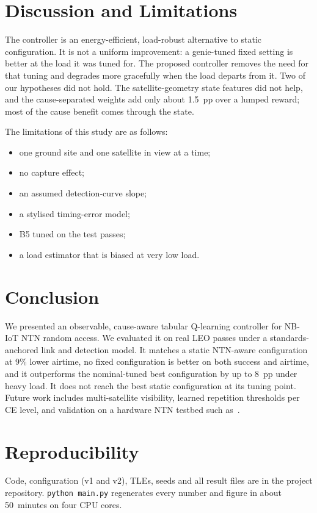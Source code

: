 \documentclass[conference]{IEEEtran}
\begin{document}
\section{Discussion and Limitations}
The controller is an energy-efficient, load-robust alternative to static configuration. It is not a uniform improvement: a genie-tuned fixed setting is better at the load it was tuned for. The proposed controller removes the need for that tuning and degrades more gracefully when the load departs from it. Two of our hypotheses did not hold. The satellite-geometry state features did not help, and the cause-separated weights add only about 1.5~pp over a lumped reward; most of the cause benefit comes through the state.

The limitations of this study are as follows:
\begin{itemize}
\item one ground site and one satellite in view at a time;
\item no capture effect;
\item an assumed detection-curve slope;
\item a stylised timing-error model;
\item B5 tuned on the test passes;
\item a load estimator that is biased at very low load.
\end{itemize}

\section{Conclusion}
We presented an observable, cause-aware tabular Q-learning controller for NB-IoT NTN random access. We evaluated it on real LEO passes under a standards-anchored link and detection model. It matches a static NTN-aware configuration at 9\% lower airtime, no fixed configuration is better on both success and airtime, and it outperforms the nominal-tuned best configuration by up to 8~pp under heavy load. It does not reach the best static configuration at its tuning point. Future work includes multi-satellite visibility, learned repetition thresholds per CE level, and validation on a hardware NTN testbed such as~\cite{kodheli2021ra}.

\section*{Reproducibility}
Code, configuration (v1 and v2), TLEs, seeds and all result files are in the project repository. \texttt{python main.py} regenerates every number and figure in about 50~minutes on four CPU cores.



\end{document}
